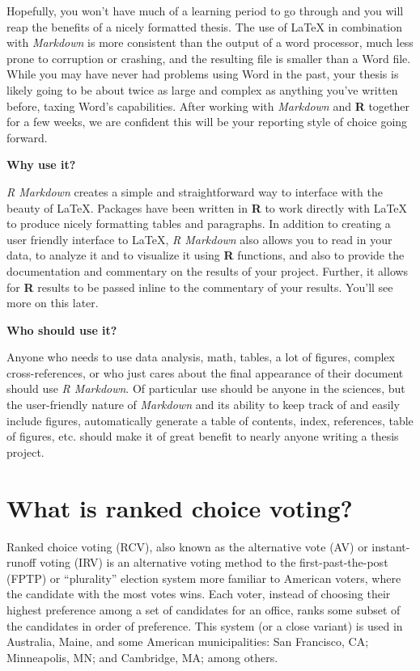 \documentclass[12pt,twoside]{reedthesis}
\theoremstyle{definition}
\theoremstyle{definition}
\theoremstyle{definition}
\theoremstyle{remark}
\begin{document}
Hopefully, you won't have much of a learning period to go through and
you will reap the benefits of a nicely formatted thesis. The use of
LaTeX in combination with \emph{Markdown} is more consistent than the
output of a word processor, much less prone to corruption or crashing,
and the resulting file is smaller than a Word file. While you may have
never had problems using Word in the past, your thesis is likely going
to be about twice as large and complex as anything you've written
before, taxing Word's capabilities. After working with \emph{Markdown}
and \textbf{R} together for a few weeks, we are confident this will be
your reporting style of choice going forward.

\textbf{Why use it?}

\emph{R Markdown} creates a simple and straightforward way to interface
with the beauty of LaTeX. Packages have been written in \textbf{R} to
work directly with LaTeX to produce nicely formatting tables and
paragraphs. In addition to creating a user friendly interface to LaTeX,
\emph{R Markdown} also allows you to read in your data, to analyze it
and to visualize it using \textbf{R} functions, and also to provide the
documentation and commentary on the results of your project. Further, it
allows for \textbf{R} results to be passed inline to the commentary of
your results. You'll see more on this later.

\textbf{Who should use it?}

Anyone who needs to use data analysis, math, tables, a lot of figures,
complex cross-references, or who just cares about the final appearance
of their document should use \emph{R Markdown}. Of particular use should
be anyone in the sciences, but the user-friendly nature of
\emph{Markdown} and its ability to keep track of and easily include
figures, automatically generate a table of contents, index, references,
table of figures, etc. should make it of great benefit to nearly anyone
writing a thesis project.

\hypertarget{litreview}{%
\chapter{What is ranked choice voting?}\label{litreview}}

Ranked choice voting (RCV), also known as the alternative vote (AV) or
instant-runoff voting (IRV) is an alternative voting method to the
first-past-the-post (FPTP) or ``plurality'' election system more
familiar to American voters, where the candidate with the most votes
wins. Each voter, instead of choosing their highest preference among a
set of candidates for an office, ranks some subset of the candidates in
order of preference. This system (or a close variant) is used in
Australia, Maine, and some American municipalities: San Francisco, CA;
Minneapolis, MN; and Cambridge, MA; among others.
\end{document}
